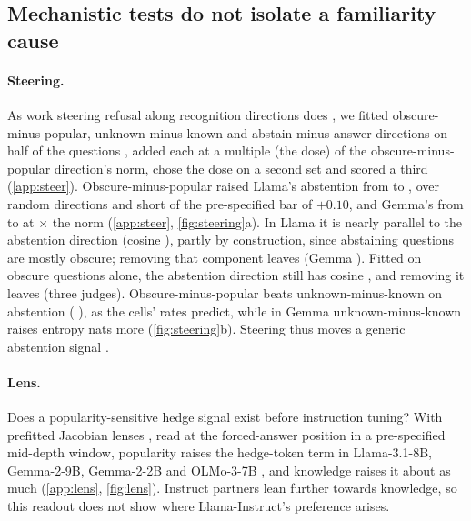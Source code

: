 \documentclass{article}
\begin{document}
\subsection{Mechanistic tests do not isolate a familiarity cause}
\label{sec:mech}

\paragraph{Steering.} As work steering refusal along recognition directions does \citep{ferrando2025iknow,brzezinka2026familiarity}, we fitted obscure-minus-popular, unknown-minus-known and abstain-minus-answer directions on half of the questions \citep{arditi2024refusal,rimsky2024caa}, added each at a multiple (the dose) of the obscure-minus-popular direction's norm, chose the dose on a second set and scored a third (\cref{app:steer}). Obscure-minus-popular raised Llama's abstention from \svLlamaNone{} to \svLlamaFam, \svLlamaDOne{} \svLlamaDOneCI{} over random directions and short of the pre-specified bar of $+0.10$, and Gemma's from \svGemmaNone{} to \svGemmaFam{} at \svGemmaDose$\times$ the norm (\cref{app:steer}, \cref{fig:steering}a). In Llama it is nearly parallel to the abstention direction (cosine \svLlamaCos), partly by construction, since abstaining questions are mostly obscure; removing that component leaves \svLlamaDTwo{} \svLlamaDTwoCI{} (Gemma \svGemmaDTwo{} \svGemmaDTwoCI). Fitted on obscure questions alone, the abstention direction still has cosine \wlLlamaCos, and removing it leaves \wlLlamaDTwo{} \wlLlamaDTwoCI{} (three judges). Obscure-minus-popular beats unknown-minus-known on abstention (\svLlamaDThree{} \svLlamaDThreeCI), as the cells' rates predict, while in Gemma unknown-minus-known raises entropy \svGemmaDFour{} \svGemmaDFourCI{} nats more (\cref{fig:steering}b). Steering thus moves a generic abstention signal \citep[cf.][]{che2026steering}.

\paragraph{Lens.} Does a popularity-sensitive hedge signal exist before instruction tuning? With prefitted Jacobian lenses \citep{gurnee2026workspace}, read at the forced-answer position in a pre-specified mid-depth window, popularity raises the hedge-token term in Llama-3.1-8B, Gemma-2-9B, Gemma-2-2B and OLMo-3-7B \citep{olmo3}, and knowledge raises it about as much (\cref{app:lens}, \cref{fig:lens}). Instruct partners lean further towards knowledge, so this readout does not show where Llama-Instruct's preference arises.
\end{document}
